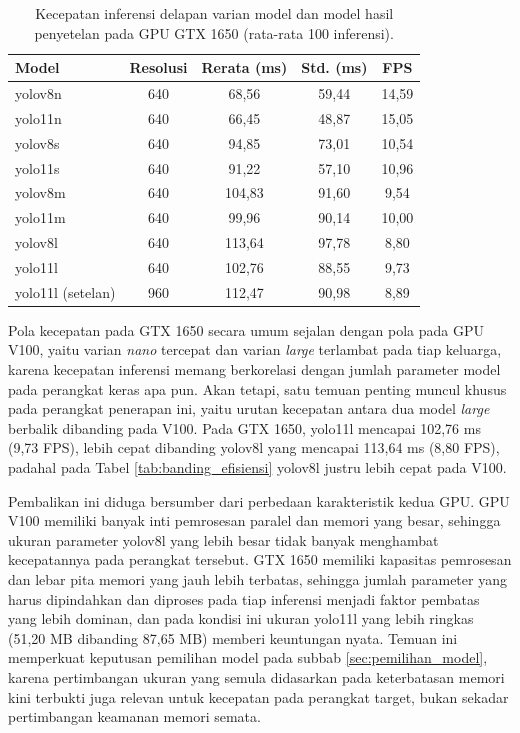 \begin{table}[htbp]
    \centering
    \caption{Kecepatan inferensi delapan varian model dan model hasil penyetelan pada GPU GTX 1650 (rata-rata 100 inferensi).}
    \label{tab:kecepatan_gtx}
    \begin{tabular}{lcccc}
        \hline
        \textbf{Model} & \textbf{Resolusi} & \textbf{Rerata (ms)} & \textbf{Std. (ms)} & \textbf{FPS} \\
        \hline \hline
        yolov8n & 640 & 68,56 & 59,44 & 14,59 \\
        yolo11n & 640 & 66,45 & 48,87 & 15,05 \\
        yolov8s & 640 & 94,85 & 73,01 & 10,54 \\
        yolo11s & 640 & 91,22 & 57,10 & 10,96 \\
        yolov8m & 640 & 104,83 & 91,60 & 9,54 \\
        yolo11m & 640 & 99,96 & 90,14 & 10,00 \\
        yolov8l & 640 & 113,64 & 97,78 & 8,80 \\
        yolo11l & 640 & 102,76 & 88,55 & 9,73 \\
        yolo11l (setelan) & 960 & 112,47 & 90,98 & 8,89 \\
        \hline
    \end{tabular}
\end{table}

Pola kecepatan pada GTX 1650 secara umum sejalan dengan pola pada GPU V100, yaitu varian 
\textit{nano} tercepat dan varian \textit{large} terlambat pada tiap keluarga, karena 
kecepatan inferensi memang berkorelasi dengan jumlah parameter model pada perangkat keras 
apa pun. Akan tetapi, satu temuan penting muncul khusus pada perangkat penerapan ini, yaitu 
urutan kecepatan antara dua model \textit{large} berbalik dibanding pada V100. Pada GTX 
1650, yolo11l mencapai 102,76 ms (9,73 FPS), lebih cepat dibanding yolov8l yang mencapai 
113,64 ms (8,80 FPS), padahal pada Tabel \ref{tab:banding_efisiensi} yolov8l justru lebih 
cepat pada V100.

Pembalikan ini diduga bersumber dari perbedaan karakteristik kedua GPU. GPU V100 memiliki 
banyak inti pemrosesan paralel dan memori yang besar, sehingga ukuran parameter yolov8l yang 
lebih besar tidak banyak menghambat kecepatannya pada perangkat tersebut. GTX 1650 memiliki 
kapasitas pemrosesan dan lebar pita memori yang jauh lebih terbatas, sehingga jumlah 
parameter yang harus dipindahkan dan diproses pada tiap inferensi menjadi faktor pembatas 
yang lebih dominan, dan pada kondisi ini ukuran yolo11l yang lebih ringkas (51,20 MB 
dibanding 87,65 MB) memberi keuntungan nyata. Temuan ini memperkuat keputusan pemilihan 
model pada subbab \ref{sec:pemilihan_model}, karena pertimbangan ukuran yang semula 
didasarkan pada keterbatasan memori kini terbukti juga relevan untuk kecepatan pada 
perangkat target, bukan sekadar pertimbangan keamanan memori semata.

